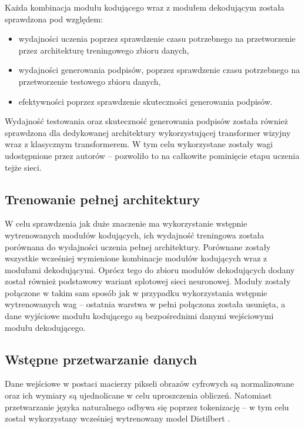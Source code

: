 Każda kombinacja modułu kodującego wraz z modułem dekodującym została sprawdzona pod względem:
\begin{itemize}
    \item wydajności uczenia poprzez sprawdzenie czasu potrzebnego na przetworzenie przez architekturę treningowego zbioru danych,
    \item wydajności generowania podpisów, poprzez sprawdzenie czasu potrzebnego na przetworzenie testowego zbioru danych,
    \item efektywności poprzez sprawdzenie skuteczności generowania podpisów.
\end{itemize}
Wydajność testowania oraz skuteczność generowania podpisów została również sprawdzona dla dedykowanej architektury \cite{wang2022git} wykorzystującej transformer wizyjny wraz z klasycznym transformerem. W tym celu wykorzystane zostały wagi udostępnione przez autorów -- pozwoliło to na całkowite pominięcie etapu uczenia tejże sieci.
\subsection{Trenowanie pełnej architektury}
W celu sprawdzenia jak duże znaczenie ma wykorzystanie wstępnie wytrenowanych modułów kodujących, ich wydajność treningowa została porównana do wydajności uczenia pełnej architektury. Porównane zostały wszystkie wcześniej wymienione kombinacje modułów kodujących wraz z modułami dekodującymi. Oprócz tego do zbioru modułów dekodujących dodany został również podstawowy wariant splotowej sieci neuronowej. Moduły zostały połączone w takim sam sposób jak w przypadku wykorzystania wstępnie wytrenowanych wag -- ostatnia warstwa w pełni połączona została usunięta, a dane wyjściowe modułu kodującego są bezpośrednimi danymi wejściowymi modułu dekodującego.
\subsection{Wstępne przetwarzanie danych}
Dane wejściowe w postaci macierzy pikseli obrazów cyfrowych są normalizowane oraz ich wymiary są ujednolicane w celu uproszczenia obliczeń. Natomiast przetwarzanie języka naturalnego odbywa się poprzez tokenizację -- w tym celu został wykorzystany wcześniej wytrenowany model Distilbert \cite{distilbert}.
